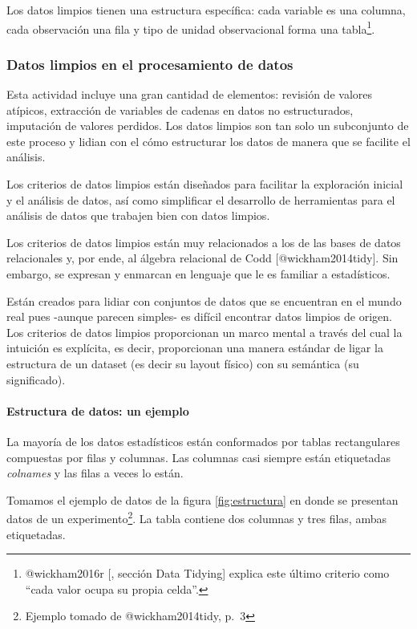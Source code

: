 \documentclass[]{article}
\let\oldparagraph\paragraph
\renewcommand{\paragraph}[1]{\oldparagraph{#1}\mbox{}}
\let\rmarkdownfootnote\footnote%
\def\footnote{\protect\rmarkdownfootnote}
\begin{document}
Los datos limpios tienen una estructura específica: cada variable es una
columna, cada observación una fila y tipo de unidad observacional forma
una tabla\footnote{@wickham2016r {[}, sección Data Tidying{]} explica
  este último criterio como ``cada valor ocupa su propia celda''.}.

\subsubsection{Datos limpios en el procesamiento de
datos}\label{datos-limpios-en-el-procesamiento-de-datos}

Esta actividad incluye una gran cantidad de elementos: revisión de
valores atípicos, extracción de variables de cadenas en datos no
estructurados, imputación de valores perdidos. Los datos limpios son tan
solo un subconjunto de este proceso y lidian con el cómo estructurar los
datos de manera que se facilite el análisis.

Los criterios de datos limpios están diseñados para facilitar la
exploración inicial y el análisis de datos, así como simplificar el
desarrollo de herramientas para el análisis de datos que trabajen bien
con datos limpios.

Los criterios de datos limpios están muy relacionados a los de las bases
de datos relacionales y, por ende, al álgebra relacional de Codd
{[}@wickham2014tidy{]}. Sin embargo, se expresan y enmarcan en lenguaje
que le es familiar a estadísticos.

Están creados para lidiar con conjuntos de datos que se encuentran en el
mundo real pues -aunque parecen simples- es difícil encontrar datos
limpios de origen. Los criterios de datos limpios proporcionan un marco
mental a través del cual la intuición es explícita, es decir,
proporcionan una manera estándar de ligar la estructura de un dataset
(es decir su layout físico) con su semántica (su significado).

\paragraph{Estructura de datos: un
ejemplo}\label{estructura-de-datos-un-ejemplo}

La mayoría de los datos estadísticos están conformados por tablas
rectangulares compuestas por filas y columnas. Las columnas casi siempre
están etiquetadas \emph{colnames} y las filas a veces lo están.

Tomamos el ejemplo de datos de la figura \ref{fig:estructura} en donde
se presentan datos de un experimento\footnote{Ejemplo tomado de
  @wickham2014tidy, p.~3}. La tabla contiene dos columnas y tres filas,
ambas etiquetadas.
\end{document}
